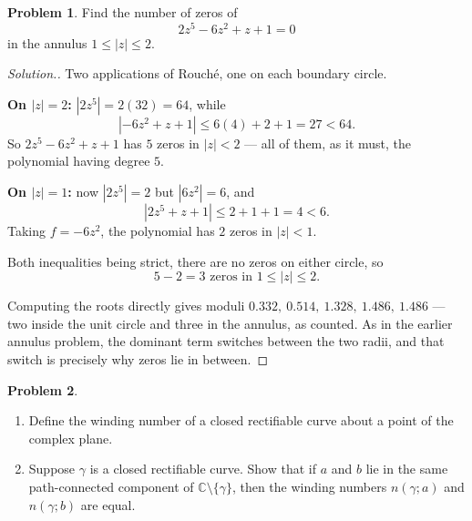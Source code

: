 \documentclass[11pt,a4paper]{article}
\theoremstyle{definition}
\newtheorem{problemx}{Problem}[section]
\newenvironment{problem}{\begin{problemx}}{\end{problemx}}
\newenvironment{solution}
  {\renewcommand{\qedsymbol}{}\begin{proof}[\textit{Solution}.]}
  {\end{proof}}
\begin{document}
\begin{problem}
Find the number of zeros of
$$2z^{5} - 6z^{2} + z + 1 = 0$$
in the annulus $1 \leq \left|z\right| \leq 2$.
\end{problem}

\begin{solution}
Two applications of Rouch\'e, one on each boundary circle.

\textbf{On $\left|z\right| = 2$:} $\left|2z^{5}\right| = 2(32) = 64$, while
$$\left|-6z^{2} + z + 1\right| \leq 6(4) + 2 + 1 = 27 < 64 .$$
So $2z^{5}-6z^{2}+z+1$ has $5$ zeros in $\left|z\right| < 2$ --- all of them, as it
must, the polynomial having degree $5$.

\textbf{On $\left|z\right| = 1$:} now $\left|2z^{5}\right| = 2$ but
$\left|6z^{2}\right| = 6$, and
$$\left|2z^{5} + z + 1\right| \leq 2 + 1 + 1 = 4 < 6 .$$
Taking $f = -6z^{2}$, the polynomial has $2$ zeros in $\left|z\right| < 1$.

Both inequalities being strict, there are no zeros on either circle, so
$$\boxed{5 - 2 = 3 \text{ zeros in } 1 \leq \left|z\right| \leq 2 .}$$

Computing the roots directly gives moduli
$0.332,\ 0.514,\ 1.328,\ 1.486,\ 1.486$ --- two inside the unit circle and three in
the annulus, as counted. As in the earlier annulus problem, the dominant term
switches between the two radii, and that switch is precisely why zeros lie in
between.
\end{solution}


\begin{problem}
\begin{enumerate}
\item[(a).] Define the winding number of a closed rectifiable curve about a point
of the complex plane.
\item[(b).] Suppose $\gamma$ is a closed rectifiable curve. Show that if $a$ and
$b$ lie in the same path-connected component of $\mathbb{C}\setminus\{\gamma\}$,
then the winding numbers $n(\gamma; a)$ and $n(\gamma; b)$ are equal.
\end{enumerate}
\end{problem}
\end{document}
